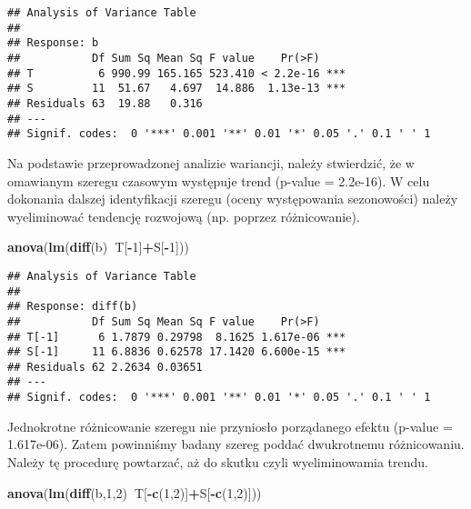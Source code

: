 \documentclass[polish,]{book}
\newenvironment{Shaded}{\begin{snugshade}}{\end{snugshade}}
\newcommand{\DecValTok}[1]{\textcolor[rgb]{0.00,0.00,0.81}{#1}}
\newcommand{\KeywordTok}[1]{\textcolor[rgb]{0.13,0.29,0.53}{\textbf{#1}}}
\newcommand{\NormalTok}[1]{#1}
\newcommand{\OperatorTok}[1]{\textcolor[rgb]{0.81,0.36,0.00}{\textbf{#1}}}
\begin{document}
\begin{verbatim}
## Analysis of Variance Table
## 
## Response: b
##           Df Sum Sq Mean Sq F value    Pr(>F)    
## T          6 990.99 165.165 523.410 < 2.2e-16 ***
## S         11  51.67   4.697  14.886  1.13e-13 ***
## Residuals 63  19.88   0.316                      
## ---
## Signif. codes:  0 '***' 0.001 '**' 0.01 '*' 0.05 '.' 0.1 ' ' 1
\end{verbatim}

Na podstawie przeprowadzonej analizie wariancji, należy stwierdzić, że w omawianym szeregu czasowym występuje trend (p-value = 2.2e-16). W celu dokonania
dalszej identyfikacji szeregu (oceny występowania sezonowości) należy wyeliminować
tendencję rozwojową (np. poprzez różnicowanie).

\begin{Shaded}
\begin{Highlighting}[]
\KeywordTok{anova}\NormalTok{(}\KeywordTok{lm}\NormalTok{(}\KeywordTok{diff}\NormalTok{(b)}\OperatorTok{~}\NormalTok{T[}\OperatorTok{-}\DecValTok{1}\NormalTok{]}\OperatorTok{+}\NormalTok{S[}\OperatorTok{-}\DecValTok{1}\NormalTok{]))}
\end{Highlighting}
\end{Shaded}

\begin{verbatim}
## Analysis of Variance Table
## 
## Response: diff(b)
##           Df Sum Sq Mean Sq F value    Pr(>F)    
## T[-1]      6 1.7879 0.29798  8.1625 1.617e-06 ***
## S[-1]     11 6.8836 0.62578 17.1420 6.600e-15 ***
## Residuals 62 2.2634 0.03651                      
## ---
## Signif. codes:  0 '***' 0.001 '**' 0.01 '*' 0.05 '.' 0.1 ' ' 1
\end{verbatim}

Jednokrotne różnicowanie szeregu nie przyniosło porządanego efektu (p-value =
1.617e-06). Zatem powinniśmy badany szereg poddać dwukrotnemu różnicowaniu. Należy tę procedurę powtarzać, aż do skutku czyli wyeliminowamia trendu.

\begin{Shaded}
\begin{Highlighting}[]
\KeywordTok{anova}\NormalTok{(}\KeywordTok{lm}\NormalTok{(}\KeywordTok{diff}\NormalTok{(b,}\DecValTok{1}\NormalTok{,}\DecValTok{2}\NormalTok{)}\OperatorTok{~}\NormalTok{T[}\OperatorTok{-}\KeywordTok{c}\NormalTok{(}\DecValTok{1}\NormalTok{,}\DecValTok{2}\NormalTok{)]}\OperatorTok{+}\NormalTok{S[}\OperatorTok{-}\KeywordTok{c}\NormalTok{(}\DecValTok{1}\NormalTok{,}\DecValTok{2}\NormalTok{)]))}
\end{Highlighting}
\end{Shaded}
\end{document}
